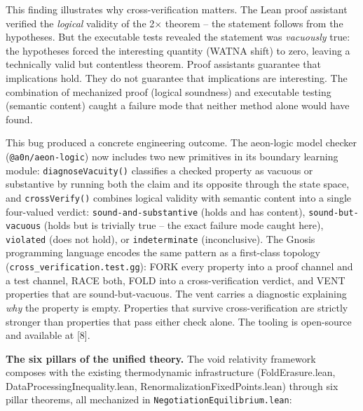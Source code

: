 \documentclass[
  11pt,
]{article}
\begin{document}
This finding illustrates why cross-verification matters. The Lean proof
assistant verified the \emph{logical} validity of the 2\(\times\)
theorem -- the statement follows from the hypotheses. But the executable
tests revealed the statement was \emph{vacuously} true: the hypotheses
forced the interesting quantity (WATNA shift) to zero, leaving a
technically valid but contentless theorem. Proof assistants guarantee
that implications hold. They do not guarantee that implications are
interesting. The combination of mechanized proof (logical soundness) and
executable testing (semantic content) caught a failure mode that neither
method alone would have found.

This bug produced a concrete engineering outcome. The aeon-logic model
checker (\texttt{@a0n/aeon-logic}) now includes two new
primitives in its boundary learning module: \texttt{diagnoseVacuity()}
classifies a checked property as vacuous or substantive by running both
the claim and its opposite through the state space, and
\texttt{crossVerify()} combines logical validity with semantic content
into a single four-valued verdict: \texttt{sound-and-substantive} (holds
and has content), \texttt{sound-but-vacuous} (holds but is trivially
true -- the exact failure mode caught here), \texttt{violated} (does not
hold), or \texttt{indeterminate} (inconclusive). The Gnosis programming
language encodes the same pattern as a first-class topology
(\texttt{cross\_verification.test.gg}): FORK every property into a proof
channel and a test channel, RACE both, FOLD into a cross-verification
verdict, and VENT properties that are sound-but-vacuous. The vent
carries a diagnostic explaining \emph{why} the property is empty.
Properties that survive cross-verification are strictly stronger than
properties that pass either check alone. The tooling is open-source and
available at {[}8{]}.

\textbf{The six pillars of the unified theory.} The void relativity
framework composes with the existing thermodynamic infrastructure
(FoldErasure.lean, DataProcessingInequality.lean,
RenormalizationFixedPoints.lean) through six pillar theorems, all
mechanized in \texttt{NegotiationEquilibrium.lean}:
\end{document}
